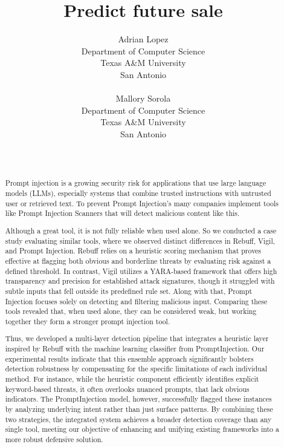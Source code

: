 \documentclass{article}
\title{Predict future sale}
\author{
 Adrian Lopez \\
  Department of Computer Science \\
  Texas A\&M University  \\
  San Antonio\\
  \text{Alope0321@jaguar.tamu.edu} \\
   \And
 Mallory Sorola \\
  Department of Computer Science \\
  Texas A\&M University \\
  San Antonio\\
  \text{Msoro02@jaguar.tamu.edu} \\
\
}
\begin{document}
\maketitle
\begin{abstract}
Prompt injection is a growing security risk for applications that use large language models (LLMs), especially systems that combine trusted instructions with untrusted user or retrieved text. To prevent Prompt Injection's many companies implement tools like Prompt Injection Scanners that will detect malicious content like this. 

Although a great tool, it is not fully reliable when used alone. So we conducted a case study evaluating similar tools, where we observed distinct differences in Rebuff, Vigil, and Prompt Injection. Rebuff relies on a heuristic scoring mechanism that proves effective at flagging both obvious and borderline threats by evaluating risk against a defined threshold. In contrast, Vigil utilizes a YARA-based framework that offers high transparency and precision for established attack signatures, though it struggled with subtle inputs that fell outside its predefined rule set. Along with that, Prompt Injection focuses solely on detecting and filtering malicious input. Comparing these tools revealed that, when used alone, they can be considered weak, but working together they form a stronger prompt injection tool. 

Thus, we developed a multi-layer detection pipeline that integrates a heuristic layer inspired by Rebuff with the machine learning classifier from PromptInjection. Our experimental results indicate that this ensemble approach significantly bolsters detection robustness by compensating for the specific limitations of each individual method. For instance, while the heuristic component efficiently identifies explicit keyword-based threats, it often overlooks nuanced prompts, that lack obvious indicators. The PromptInjection model, however, successfully flagged these instances by analyzing underlying intent rather than just surface patterns. By combining these two strategies, the integrated system achieves a broader detection coverage than any single tool, meeting our objective of enhancing and unifying existing frameworks into a more robust defensive solution.
\end{abstract}


\end{document}
